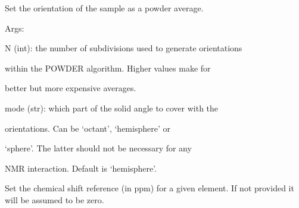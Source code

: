 \documentclass[letterpaper,10pt,english]{sphinxmanual}
\begin{document}
\begin{fulllineitems}
\begin{fulllineitems}
\label{doctree/soprano.calculate.nmr.nmr:soprano.calculate.nmr.nmr.NMRCalculator.set_powder}
Set the orientation of the sample as a powder average.

\begin{DUlineblock}{0em}
\item[] Args:
\item[]
\begin{DUlineblock}{\DUlineblockindent}
\item[] N (int): the number of subdivisions used to generate orientations
\item[]
\begin{DUlineblock}{\DUlineblockindent}
\item[] within the POWDER algorithm. Higher values make for
\item[] better but more expensive averages.
\end{DUlineblock}
\item[] mode (str): which part of the solid angle to cover with the 
\item[]
\begin{DUlineblock}{\DUlineblockindent}
\item[] orientations. Can be `octant', `hemisphere' or
\item[] `sphere'. The latter should not be necessary for any
\item[] NMR interaction. Default is `hemisphere'.
\end{DUlineblock}
\end{DUlineblock}
\end{DUlineblock}

\end{fulllineitems}


\begin{fulllineitems}
\label{doctree/soprano.calculate.nmr.nmr:soprano.calculate.nmr.nmr.NMRCalculator.set_reference}
Set the chemical shift reference (in ppm) for a given element. If not
provided it will be assumed to be zero.


\end{fulllineitems}
\end{fulllineitems}
\end{document}
